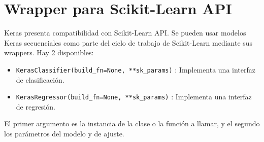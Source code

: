 \section{Wrapper para Scikit-Learn API}
Keras presenta compatibilidad con Scikit-Learn API. Se pueden usar modelos Keras secuenciales como parte del ciclo de trabajo de Scikit-Learn mediante sus wrappers. Hay 2 disponibles:
\begin{itemize}[noitemsep]
\item \lstinline{KerasClassifier(build_fn=None, **sk_params)} : Implementa una interfaz de clasificación.
\item \lstinline{KerasRegressor(build_fn=None, **sk_params)} : Implementa una interfaz de regresión.
\end{itemize}
El primer argumento es la instancia de la clase o la función a llamar, y el segundo los parámetros del modelo y de ajuste.
